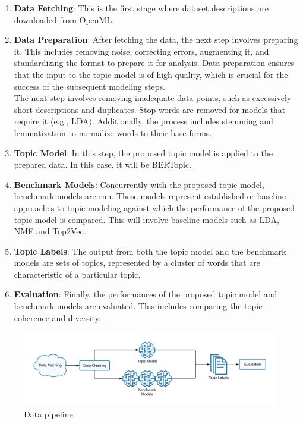 \begin{enumerate}

    \item \textbf{Data Fetching}: This is the first stage where dataset descriptions are downloaded from OpenML.

    \item \textbf{Data Preparation}: After fetching the data, the next step involves preparing it. This includes removing noise, correcting errors, augmenting it, and standardizing the format to prepare it for analysis. Data preparation ensures that the input to the topic model is of high quality, which is crucial for the success of the subsequent modeling steps. \\ The next step involves removing inadequate data points, such as excessively short descriptions and duplicates. Stop words are removed for models that require it (e.g., LDA). Additionally, the process includes stemming and lemmatization to normalize words to their base forms.

    \item \textbf{Topic Model}: In this step, the proposed topic model is applied to the prepared data. In this case, it will be BERTopic.

    \item \textbf{Benchmark Models}: Concurrently with the proposed topic model, benchmark models are run. These models represent established or baseline approaches to topic modeling against which the performance of the proposed topic model is compared. This will involve baseline models such as LDA, NMF and Top2Vec.

    \item \textbf{Topic Labels}: The output from both the topic model and the benchmark models are sets of topics, represented by a cluster of words that are characteristic of a particular topic.

    \item \textbf{Evaluation}: Finally, the performances of the proposed topic model and benchmark models are evaluated. This includes comparing the topic coherence and diversity.

\end{enumerate}

\begin{figure}[h]
    \centering
    \includegraphics[width=\textwidth]{figures/data_pipeline.pdf}
    \caption{Data pipeline}
    \label{fig:data_pipeline}
\end{figure}

